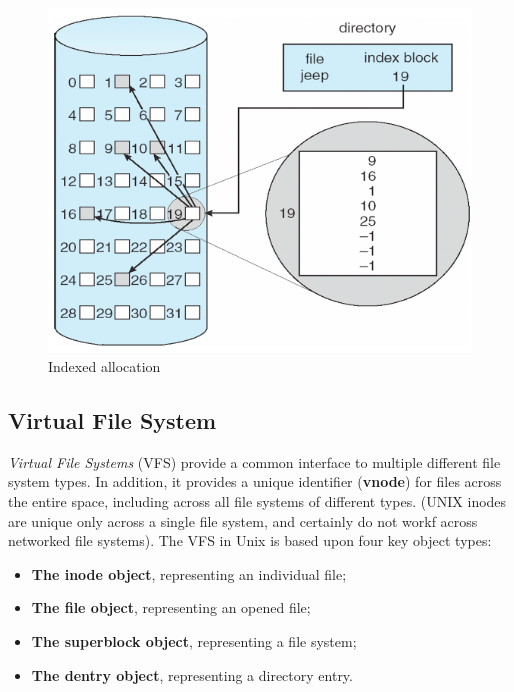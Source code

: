 \begin{figure}[hbtp]
\centering
\includegraphics[scale=0.35]{images/file_system/indexed_allocation.png}
\caption{Indexed allocation}
\end{figure}

\subsection{Virtual File System}
\emph{Virtual File Systems} (VFS) provide a common interface to multiple different file system types. In addition, it provides a unique identifier (\textbf{vnode}) for files across the entire space, including across all file systems of different types. (UNIX inodes are unique only across a single file system, and certainly do not workf across networked file systems). The VFS in Unix is based upon four key object types:
\begin{itemize}
\item \textbf{The inode object}, representing an individual file;
\item \textbf{The file object}, representing an opened file;
\item \textbf{The superblock object}, representing a file system;
\item \textbf{The dentry object}, representing a directory entry.
\end{itemize}

